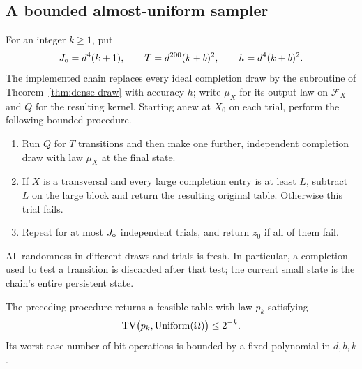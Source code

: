 \subsection{A bounded almost-uniform sampler}

For an integer $k\ge1$, put
\begin{equation}\label{eq:outer-parameters}
 J_{\rm o}=d^4(k+1),\qquad
 T=d^{200}(k+b)^2,\qquad h=d^4(k+b)^2.
\end{equation}
The implemented chain replaces every ideal completion draw by the
subroutine of Theorem~\ref{thm:dense-draw} with accuracy $h$; write $\mu_X$
for its output law on $\mathcal F_X$ and $Q$ for the resulting kernel.
Starting anew at $X_0$ on each trial, perform the following bounded procedure.
\begin{enumerate}
\item Run $Q$ for $T$ transitions and then make one further, independent
completion draw with law $\mu_X$ at the final state.
\item If $X$ is a transversal and every large completion entry is at least
$L$, subtract $L$ on the large block and return the resulting original
table. Otherwise this trial fails.
\item Repeat for at most $J_{\rm o}$ independent trials, and return $z_0$
if all of them fail.
\end{enumerate}
All randomness in different draws and trials is fresh. In particular, a
completion used to test a transition is discarded after that test; the
current small state is the chain's entire persistent state.

\begin{theorem}\label{thm:almost-uniform}
The preceding procedure returns a feasible table with law $p_k$ satisfying
\[
 \operatorname{TV}\bigl(p_k,\operatorname{Uniform}(\Omega)\bigr)\le2^{-k}.
\]
Its worst-case number of bit operations is bounded by a fixed polynomial
in $d,b,k$.
\end{theorem}


